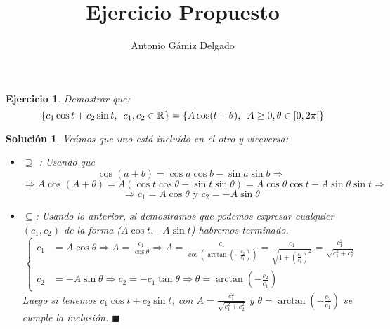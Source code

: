 \documentclass[12pt]{article}
\newcommand{\R}[1][]{\mathbb{R}^{#1}}
\newcommand{\qued}{\hfill$\blacksquare$}
\newtheorem*{theorem*}{Ejercicio}
\newtheorem*{proof*}{Solución}
\begin{document}

\author{Antonio Gámiz Delgado}
\title{Ejercicio Propuesto}
\maketitle


\begin{theorem*}
Demostrar que:
\[
\{ c_1\cos t +c_2 \sin t, \enskip c_1,c_2\in\R \} = \{ A\cos (t+\theta), \enskip A\geq 0,\theta \in [0,2\pi[ \}
\]
\end{theorem*}

\begin{proof*} 
Veámos que uno está incluído en el otro y viceversa:
\begin{itemize}
\item $\supseteq$ : Usando que 
\[
\cos(a+b)=\cos a \cos b - \sin a \sin b \Longrightarrow
\]
\[
\Longrightarrow A\cos (A+\theta) = A\left( \cos t \cos \theta - \sin t \sin \theta \right) = A\cos \theta\cos t - A\sin\theta\sin t \Longrightarrow
\]
\[
\Longrightarrow c_1 = A\cos\theta \text{ y } c_2 = -A\sin\theta
\]
\item $\subseteq$: Usando lo anterior, si demostramos que podemos expresar cualquier $(c_1,c_2)$ de la forma ($A\cos t, -A\sin t$) habremos terminado.
\[
\left \{ \begin{array}{ll}
c_1 &= A\cos \theta \Longrightarrow A = \displaystyle\frac{c_1}{\cos\theta} \Longrightarrow A = \frac{c_1}{\cos\left(\arctan\left(-\displaystyle\frac{c_2}{c_1}\right)\right) } = \frac{c_1}{\sqrt{1+\left(\frac{c_2}{c_1}\right)^2}}=\frac{c_1^2}{\sqrt{c_1^2+c_2^2}}\\
c_2 &= -A\sin \theta \Longrightarrow c_2 = -c_1\tan\theta \Longrightarrow \theta = \arctan\left(-\displaystyle\frac{c_2}{c_1}\right)
\end{array}\right.
\]
Luego si tenemos $c_1\cos t + c_2\sin t$, con $A=\frac{c_1^2}{\sqrt{c_1^2+c_2^2}}$ y $\theta=\arctan\left( -\frac{c_2}{c_1} \right)$ se cumple la inclusión. \qued

\end{itemize}
\end{proof*}
\end{document}
